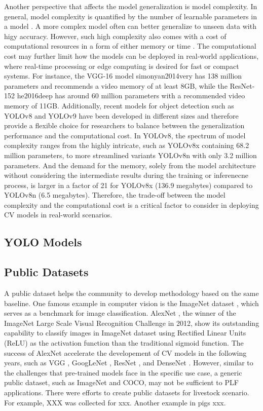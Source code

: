 Another perspective that affects the model generalization is model complexity. In general, model complexity is quantified by the number of learnable parameters in a model \citep{}. A more complex model often can better generalize to unseen data with higy accuracy. However, such high complexity also comes with a cost of computational resources in a form of either memory or time \citep{}. The computational cost may further limit how the models can be deployed in real-world applications, where real-time processing or edge computing is desired for fast or compact systems. For instance, the VGG-16 model {simonyan2014very} has 138 million parameters and recommends a video memory of at least 8GB, while the ResNet-152 {he2016deep} has around 60 million parameters with a recommended video memory of 11GB. Additionally, recent models for object detection such as YOLOv8 \citep{} and YOLOv9 \citep{} have been developed in different sizes and therefore provide a flexible choice for researchers to balance between the generalization performance and the computational cost. In YOLOv8, the spectrum of model complexity ranges from the highly intricate, such as YOLOv8x containing 68.2 million parameters, to more streamlined variants YOLOv8n with only 3.2 million parameters. And the demand for the memory, solely from the model architecture without considering the intermediate results during the training or inferenecne process, is larger in a factor of 21 for YOLOv8x (136.9 megabytes) compared to YOLOv8n (6.5 megabytes). Therefore, the trade-off between the model complexity and the computational cost is a critical factor to consider in deploying CV models in real-world scenarios.

\subsection*{YOLO Models}

\subsection*{Public Datasets}

A public dataset helps the community to develop methodology based on the same baseline. One famous example in computer vision is the ImageNet dataset \citep{}, which serves as a benchmark for image classification. AlexNet \citep{}, the winner of the ImageNet Large Scale Visual Recognition Challenge in 2012, show its outstanding capability to classify images in ImageNet dataset using Rectified Linear Units (ReLU) as the activation function than the traditional sigmoid function. The success of AlexNet accelerate the developement of CV models in the following years, such as VGG \citep{}, GoogLeNet \citep{}, ResNet \citep{}, and DenseNet \citep{}. However, similar to the challenges that pre-trained models face in the specific use case, a generic public dataset, such as ImageNet and COCO, may not be sufficient to PLF applications. There  were efforts to create public datasets for livestock scenario. For example, XXX \citep{} was collected for xxx. Another example in pigs xxx.

